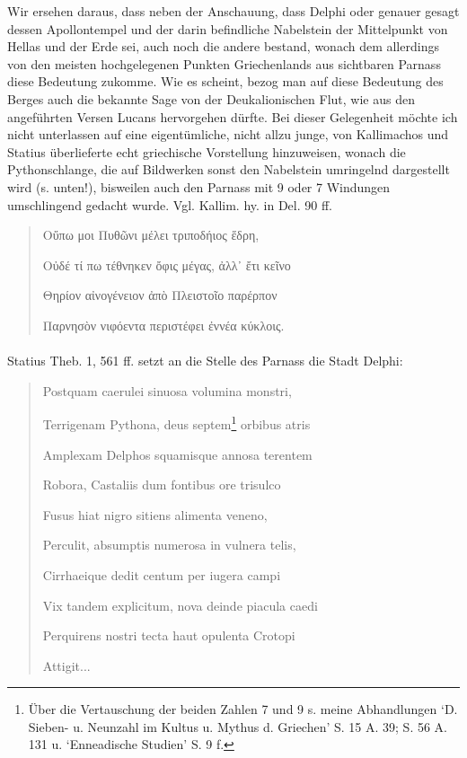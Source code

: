 \documentclass[a4paper, 11pt, oneside]{article}
\begin{document}
Wir ersehen daraus, dass neben der Anschauung, dass Delphi oder genauer gesagt dessen Apollontempel und der darin befindliche Nabelstein der Mittelpunkt von Hellas und der Erde sei, auch noch die andere bestand, wonach dem allerdings von den meisten hochgelegenen Punkten Griechenlands aus sichtbaren Parnass diese Bedeutung zukomme. Wie es scheint, bezog man auf diese Bedeutung des Berges auch die bekannte Sage von der Deukalionischen Flut, wie aus den angeführten Versen Lucans hervorgehen dürfte. Bei dieser Gelegenheit möchte ich nicht unterlassen auf eine eigentümliche, nicht allzu junge, von Kallimachos und Statius überlieferte echt griechische Vorstellung hinzuweisen, wonach die Pythonschlange, die auf Bildwerken sonst den Nabelstein umringelnd dargestellt wird (s. unten!), bisweilen auch den Parnass mit 9 oder 7 Windungen umschlingend gedacht wurde. Vgl. Kallim. hy. in Del. 90 ff.
\begin{quotation}
Οὔπω μοι Πυθῶνι μέλει τριποδήιος ἕδρη,

Οὐδέ τί πω τέθνηκεν ὄφις μέγας, ἀλλ᾽ ἔτι κεῖνο

Θηρίον αἰνογένειον ἀπὸ Πλειστοῖο παρέρπον

Παρνησὸν νιφόεντα περιστέφει ἐννέα κύκλοις.
\end{quotation}
\paragraph{}
Statius Theb. 1, 561 ff. setzt an die Stelle des Parnass die Stadt Delphi:
\begin{quotation}
Postquam caerulei sinuosa volumina monstri,

Terrigenam Pythona, deus septem\footnote{Über die Vertauschung der beiden Zahlen 7 und 9 s. meine Abhandlungen `D. Sieben- u. Neunzahl im Kultus u. Mythus d. Griechen' S. 15 A. 39; S. 56 A. 131 u. `Enneadische Studien' S. 9 f.} orbibus atris

Amplexam Delphos squamisque annosa terentem

Robora, Castaliis dum fontibus ore trisulco

Fusus hiat nigro sitiens alimenta veneno,

Perculit, absumptis numerosa in vulnera telis,

Cirrhaeique dedit centum per iugera campi

Vix tandem explicitum, nova deinde piacula caedi

Perquirens nostri tecta haut opulenta Crotopi

Attigit...
\end{quotation}
\end{document}
